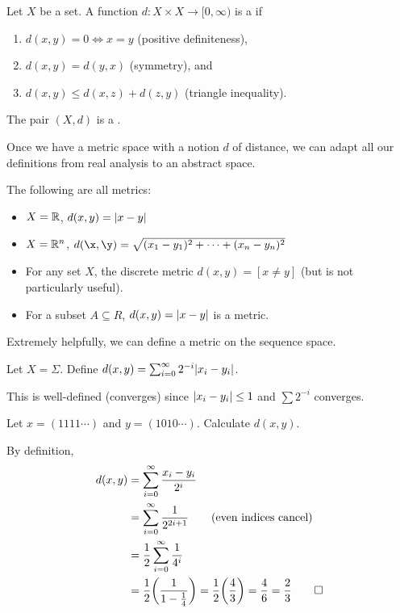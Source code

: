\documentclass[class=pmath370,tikz,notes]{agony}
\begin{document}
\begin{defn}
  Let $X$ be a set.
  A function $d : X \times X \to [0,\infty)$ is a  if
  \begin{enumerate}[nosep]
    \item $d(x,y) = 0 \iff x = y$ (positive definiteness),
    \item $d(x,y) = d(y,x)$ (symmetry), and
    \item $d(x,y) \leq d(x,z) + d(z,y)$ (triangle inequality).
  \end{enumerate}
  The pair $(X,d)$ is a .
\end{defn}

Once we have a metric space with a notion $d$ of distance,
we can adapt all our definitions from real analysis to an abstract space.

\begin{example}
  The following are all metrics:
  \begin{itemize}
    \item $X = \mathbb{R}$, $d(x,y) = \abs{x-y}$
    \item $X = \mathbb{R}^n$, $d(\x, \y) = \sqrt{(x_1-y_1)^2 + \dotsb + (x_n-y_n)^2}$
    \item For any set $X$, the discrete metric $d(x,y) = [x\neq y]$
          (but is not particularly useful).
    \item For a subset $A \subseteq R$, $d(x,y) = \abs{x-y}$ is a metric.
  \end{itemize}
\end{example}

Extremely helpfully, we can define a metric on the sequence space.

\begin{defn}
  Let $X = \Sigma$.
  Define $d(x,y) = \sum_{i=0}^\infty 2^{-i}\abs{x_i-y_i}$.

  This is well-defined (converges) since $\abs{x_i-y_i} \leq 1$ and $\sum 2^{-i}$ converges.
\end{defn}

\begin{example}
  Let $x = (1111\cdots)$ and $y = (1010\cdots)$.
  Calculate $d(x,y)$.
\end{example}
\begin{sol}
  By definition,
  \begin{align*}
    d(x,y) & = \sum_{i=0}^\infty \frac{x_i-y_i}{2^i}                                                \\
           & = \sum_{i=0}^\infty \frac{1}{2^{2i+1}} \tag{even indices cancel}                       \\
           & = \frac12\sum_{i=0}^\infty \frac{1}{4^i}                                               \\
           & = \frac12\qty(\frac{1}{1-\frac14}) = \frac12\qty(\frac43) = \frac46 = \frac23 \qedhere
  \end{align*}
\end{sol}
\end{document}
